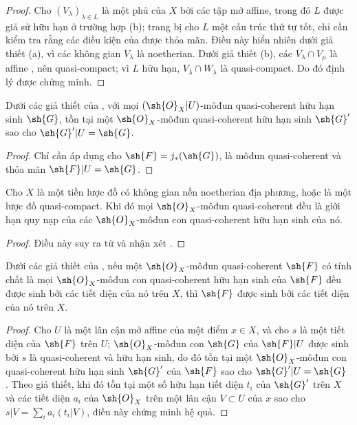 \documentclass[oneside]{amsart}
\newcommand{\oldpage}[2][]{{\marginnote{\normalfont\textbf{#1}~|~#2}}\ignorespaces}
\let\EGAOriginalLabel\label
\renewcommand{\label}[1]{\phantomsection\EGAOriginalLabel{#1}}
\begin{document}
\oldpage[I]{176}
\begin{proof}
Cho $(V_\lambda)_{\lambda\in L}$ là một phủ của $X$ bởi các tập mở affine, trong đó
$L$ được giả sử hữu hạn ở trường hợp (b); trang bị cho $L$ một cấu trúc thứ tự tốt,
chỉ cần kiểm tra rằng các điều kiện của  được thỏa mãn. Điều này hiển
nhiên dưới giả thiết (a), vì các không gian $V_\lambda$ là noetherian. Dưới giả thiết
(b), các $V_\lambda\cap V_\mu$ là affine , nên quasi-compact; vì $L$
hữu hạn, $V_\lambda\cap W_\lambda$ là quasi-compact. Do đó định lý được chứng minh.
\end{proof}

\begin{corollary}[9.4.8]
\label{I.9.4.8}
Dưới các giả thiết của , với mọi $(\sh{O}_X|U)$-môđun quasi-coherent
hữu hạn sinh $\sh{G}$, tồn tại một $\sh{O}_X$-môđun quasi-coherent hữu hạn sinh
$\sh{G}'$ sao cho $\sh{G}'|U=\sh{G}$.
\end{corollary}

\begin{proof}
Chỉ cần áp dụng  cho $\sh{F}=j_*(\sh{G})$, là môđun quasi-coherent
 và thỏa mãn $\sh{F}|U=\sh{G}$.
\end{proof}

\begin{corollary}[9.4.9]
\label{I.9.4.9}
Cho $X$ là một tiền lược đồ có không gian nền noetherian địa phương, hoặc là một lược
đồ quasi-compact. Khi đó mọi $\sh{O}_X$-môđun quasi-coherent đều là giới hạn quy nạp
của các $\sh{O}_X$-môđun con quasi-coherent hữu hạn sinh của nó.
\end{corollary}

\begin{proof}
Điều này suy ra từ  và nhận xét .
\end{proof}

\begin{corollary}[9.4.10]
\label{I.9.4.10}
Dưới các giả thiết của , nếu một $\sh{O}_X$-môđun quasi-coherent
$\sh{F}$ có tính chất là mọi $\sh{O}_X$-môđun con quasi-coherent hữu hạn sinh của $\sh{F}$
đều được sinh bởi các tiết diện của nó trên $X$, thì $\sh{F}$ được sinh bởi các
tiết diện của nó trên $X$.
\end{corollary}

\begin{proof}
Cho $U$ là một lân cận mở affine của một điểm $x\in X$, và cho $s$ là một tiết diện của
$\sh{F}$ trên $U$; $\sh{O}_X$-môđun con $\sh{G}$ của $\sh{F}|U$ được sinh bởi $s$ là
quasi-coherent và hữu hạn sinh, do đó tồn tại một $\sh{O}_X$-môđun con quasi-coherent
hữu hạn sinh $\sh{G}'$ của $\sh{F}$ sao cho $\sh{G}'|U=\sh{G}$ . Theo
giả thiết, khi đó tồn tại một số hữu hạn tiết diện $t_i$ của $\sh{G}'$ trên $X$ và
các tiết diện $a_i$ của $\sh{O}_X$ trên một lân cận $V\subset U$ của $x$ sao cho
$s|V=\sum_i a_i(t_i|V)$, điều này chứng minh hệ quả.
\end{proof}
\end{document}

